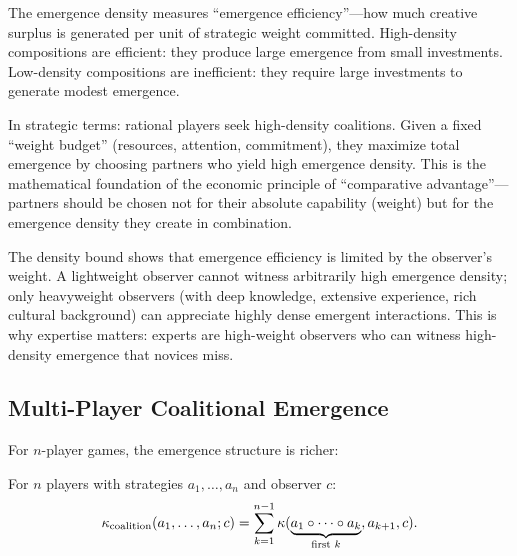 \begin{interpretation}
The emergence density measures ``emergence efficiency''---how much creative
surplus is generated per unit of strategic weight committed. High-density
compositions are efficient: they produce large emergence from small investments.
Low-density compositions are inefficient: they require large investments to
generate modest emergence.

In strategic terms: rational players seek high-density coalitions. Given a
fixed ``weight budget'' (resources, attention, commitment), they maximize total
emergence by choosing partners who yield high emergence density. This is the
mathematical foundation of the economic principle of ``comparative advantage''---partners
should be chosen not for their absolute capability (weight) but for the
emergence density they create in combination.

The density bound shows that emergence efficiency is limited by the observer's
weight. A lightweight observer cannot witness arbitrarily high emergence density;
only heavyweight observers (with deep knowledge, extensive experience, rich
cultural background) can appreciate highly dense emergent interactions. This
is why expertise matters: experts are high-weight observers who can witness
high-density emergence that novices miss.
\end{interpretation}

\subsection{Multi-Player Coalitional Emergence}

For $n$-player games, the emergence structure is richer:

\begin{theorem}
\label{thm:n-player-emergence}
For $n$ players with strategies $a_1, \ldots, a_n$ and observer $c$:
\[
  \kappa_{\text{coalition}}(a_1, \ldots, a_n; c) =
  \sum_{k=1}^{n-1} \kappa(\underbrace{a_1 \circ \cdots \circ a_k}_{\text{first } k},
  a_{k+1}, c).
\]
\end{theorem}

